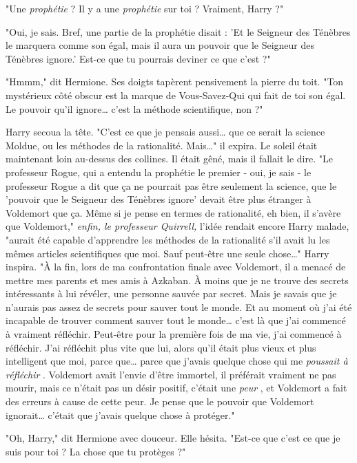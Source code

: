 "Une \emph{prophétie}  ? Il y a une \emph{prophétie}  sur toi ? Vraiment, Harry ?"

"Oui, je sais. Bref, une partie de la prophétie disait : 'Et le Seigneur des Ténèbres le marquera comme son égal, mais il aura un pouvoir que le Seigneur des Ténèbres ignore.' Est-ce que tu pourrais deviner ce que c'est ?"

"Hmmm," dit Hermione. Ses doigts tapèrent pensivement la pierre du toit. "Ton mystérieux côté obscur est la marque de Vous-Savez-Qui qui fait de toi son égal. Le pouvoir qu'il ignore… c'est la méthode scientifique, non ?"

Harry secoua la tête. "C'est ce que je pensais aussi… que ce serait la science Moldue, ou les méthodes de la rationalité. Mais…" il expira. Le soleil était maintenant loin au-dessus des collines. Il était gêné, mais il fallait le dire. "Le professeur Rogue, qui a entendu la prophétie le premier - oui, je sais - le professeur Rogue a dit que ça ne pourrait pas être seulement la science, que le 'pouvoir que le Seigneur des Ténèbres ignore' devait être plus étranger à Voldemort que ça. Même si je pense en termes de rationalité, eh bien, il s'avère que Voldemort," \emph{enfin, le professeur Quirrell,}  l'idée rendait encore Harry malade, "aurait été capable d'apprendre les méthodes de la rationalité s'il avait lu les mêmes articles scientifiques que moi. Sauf peut-être une seule chose…" Harry inspira. "À la fin, lors de ma confrontation finale avec Voldemort, il a menacé de mettre mes parents et mes amis à Azkaban. À moins que je ne trouve des secrets intéressants à lui révéler, une personne sauvée par secret. Mais je savais que je n'aurais pas assez de secrets pour sauver tout le monde. Et au moment où j'ai été incapable de trouver comment sauver tout le monde… c'est là que j'ai commencé à vraiment réfléchir. Peut-être pour la première fois de ma vie, j'ai commencé à réfléchir. J'ai réfléchit plus vite que lui, alors qu'il était plus vieux et plus intelligent que moi, parce que… parce que j'avais quelque chose qui me \emph{poussait à réfléchir} . Voldemort avait l'envie d'être immortel, il préférait vraiment ne pas mourir, mais ce n'était pas un désir positif, c'était une \emph{peur} , et Voldemort a fait des erreurs à cause de cette peur. Je pense que le pouvoir que Voldemort ignorait… c'était que j'avais quelque chose à protéger."

"Oh, Harry," dit Hermione avec douceur. Elle hésita. "Est-ce que c'est ce que je suis pour toi ? La chose que tu protèges ?"

